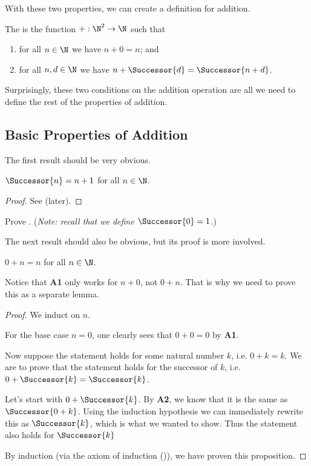With these two properties, we can create a definition for addition.

\begin{definition}[Addition]
    The  is the function $+: \N^2 \to \N$ such that
    \begin{enumerate}[label=\textbf{A\arabic*.}]
        \item for all $n\in \N$ we have $n + 0 = n$; and
        \item for all $n, d \in \N$ we have $n + \Successor{d} = \Successor{n + d}$.
    \end{enumerate}
\end{definition}

Surprisingly, these two conditions on the addition operation are all we need to define the rest of the properties of addition.

\subsection{Basic Properties of Addition}
The first result should be very obvious.

\begin{proposition}[Successor of $n$]\label{prop:successor-of-n}
    $\Successor{n} = n + 1$ for all $n \in \N$.
\end{proposition}
\begin{proof}
    See  (later).
\end{proof}

\begin{exercise}[Successor of $n$]\label{exercise:successor-of-n}
    Prove .\newline
    (\textit{Note: recall that we define $\Successor{0} = 1$.})
\end{exercise}

The next result should also be obvious, but its proof is more involved.
\begin{lemma}\label{lemma:sum-of-0-and-n}
    $0 + n = n$ for all $n \in \N$.
\end{lemma}
Notice that \textbf{A1} only works for $n + 0$, not $0 + n$. That is why we need to prove this as a separate lemma.
\begin{proof}
    We induct on $n$.

    For the base case $n = 0$, one clearly sees that $0 + 0 = 0$ by \textbf{A1}.

    Now suppose the statement holds for some natural number $k$, i.e. $0 + k = k$. We are to prove that the statement holds for the successor of $k$, i.e. $0 + \Successor{k} = \Successor{k}$.

    Let's start with $0 + \Successor{k}$. By \textbf{A2}, we know that it is the same as $\Successor{0 + k}$. Using the induction hypothesis we can immediately rewrite this as $\Successor{k}$, which is what we wanted to show. Thus the statement also holds for $\Successor{k}$

    By induction (via the axiom of induction ()), we have proven this proposition.
\end{proof}

